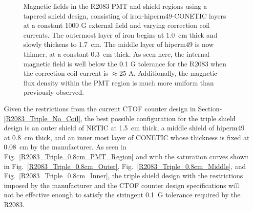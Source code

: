 \documentclass[12pt]{article}
\begin{document}
\begin{figure}[ht]
\caption{\small{Magnetic fields in the R2083 PMT and shield regions using a tapered shield design, consisting of iron-hiperm49-CONETIC layers at a constant 1000 G external field and varying correction coil currents. The outermost layer of iron begins at 1.0~cm thick and slowly thickens to 1.7~cm. The middle layer of hiperm49 is now thinner, at a constant 0.3~cm thick. As seen here, the internal magnetic field is well below the 0.1 G tolerance for the R2083 when the correction coil current is $\approx$25 A. Additionally, the magnetic flux density within the PMT region is much more uniform than previously observed.}}\label{Tapered_Shield_0.3cm}
\end{figure}


 
                                                                                                                                                    
Given the restrictions from the current CTOF counter design in Section-\ref{R2083_Triple_No_Coil}, 
the best possible configuration for the triple shield design is an outer shield of NETIC at 1.5~cm thick,
 a middle shield of hiperm49 at 0.8~cm thick, and an inner most layer of CONETIC whose 
thickness is fixed at 0.08~cm by the manufacturer. As seen in Fig.~\ref{R2083_Triple_0.8cm_PMT_Region}
 and with the saturation curves shown in Fig.~\ref{R2083_Triple_0.8cm_Outer}, Fig.~\ref{R2083_Triple_0.8cm_Middle},
 and Fig.~\ref{R2083_Triple_0.8cm_Inner}, the triple shield design with the restrictions imposed by the
 manufacturer and the CTOF counter design specifications will not be effective enough to satisfy the stringent
 0.1~G tolerance required by the R2083.












\end{document}
